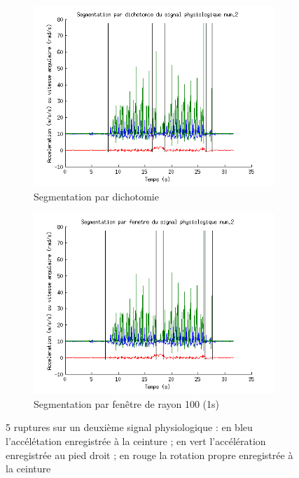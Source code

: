 \documentclass[french,11pt,notitlepage]{report}
\begin{document}
	\begin{figure}[hp]
		\begin{subfigure}[t]{.49\textwidth}
		  \includegraphics[width=\linewidth,height=.25\textheight]{phys2_dikt}
			\caption{Segmentation par dichotomie}
			\label{}
		\end{subfigure}
		\hfill
		\begin{subfigure}[t]{.49\textwidth}
			\includegraphics[width=\linewidth,height=.25\textheight]{phys2_mid}
			\caption{Segmentation par fenêtre de rayon 100 (1s)}
			\label{}
		\end{subfigure}
	\caption{5 ruptures sur un deuxième signal physiologique : en bleu l'accélétation enregistrée à la ceinture ; en vert l'accélération enregistrée au pied droit ; en rouge la rotation propre enregistrée à la ceinture}
	\label{score_min}
	\end{figure}
	
\end{document}
